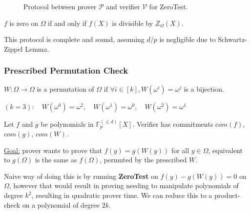 \documentclass[../lecture-notes.tex]{subfiles}
\begin{document}
\begin{figure}[H]
  \caption{Protocol between prover $\mathcal{P}$ and verifier $\mathcal{V}$ for ZeroTest.}
  \label{fig:polynomial_commitment}
\end{figure}

\begin{lemma}
    $f$ is zero on $\Omega$ if and only if $f(X)$ is divisible by $Z_{\Omega}(X)$.
\end{lemma}

\begin{remark}
This protocol is complete and sound, assuming $d/p$ is negligible due to Schwartz-Zippel Lemma.
\end{remark}

\subsubsection{Prescribed Permutation Check}

\begin{definition}
\(W : \Omega \rightarrow \Omega\) is a permutation of \(\Omega\) if \(\forall i \in [k], W(\omega^i) = \omega^{j}\) is a bijection.
\end{definition}

\begin{example}
 $(k=3): \quad W(\omega^0) = \omega^2, \quad W(\omega^1) = \omega^0, \quad W(\omega^2) = \omega^1$
\end{example}

Let \(f\) and \(g\) be polynomials in \(\mathbb{F}_p^{(\leq d)}[X]\). Verifier has commitments \(com(f)\), \(com(g)\), \(com(W)\).

\underline{Goal:} prover wants to prove that \(f(y) = g(W(y))\) for all \(y \in \Omega\), equivalent to \(g(\Omega)\) is the same as \(f(\Omega)\), permuted by the prescribed \(W\).

Naive way of doing this is by running \textbf{ZeroTest} on \(f(y) - g(W(y)) = 0\) on \(\Omega\), however that would result in proving needing to manipulate polynomials of degree \(k^2\), resulting in quadratic prover time. We can reduce this to a product-check on a polynomial of degree \(2k\).
\end{document}
